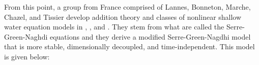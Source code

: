 From this point, a group from France comprised of Lannes, Bonneton, Marche, Chazel, and Tissier develop addition theory and classes of nonlinear shallow water equation models in \cite{bonneton2011splitting}, \cite{lannes2009derivation}, and \cite{lannes2015new}. They stem from what are called the Serre-Green-Naghdi equations and they derive a modified Serre-Green-Nagdhi model that is more stable, dimensionally decoupled, and time-independent. This model is given below:
%
%
%

